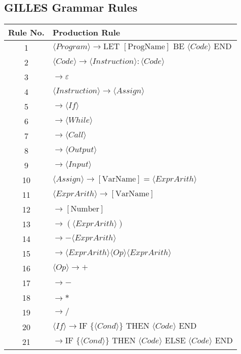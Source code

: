 \subsection{GILLES Grammar Rules}
\begin{table}[h!]
\centering
\footnotesize
\begin{tabular}{|c|l|}
\hline
\textbf{Rule No.} & \textbf{Production Rule} \\ \hline
1  & $\langle Program \rangle \rightarrow \text{LET } [\text{ProgName}] \text{ BE } \langle Code \rangle \text{ END}$ \\ \hline
2  & $\langle Code \rangle \rightarrow \langle Instruction \rangle : \langle Code \rangle$ \\ \hline
3  & $\rightarrow \varepsilon$ \\ \hline
4  & $\langle Instruction \rangle \rightarrow \langle Assign \rangle$ \\ \hline
5  & $\rightarrow \langle If \rangle$ \\ \hline
6  & $\rightarrow \langle While \rangle$ \\ \hline
7  & $\rightarrow \langle Call \rangle$ \\ \hline
8  & $\rightarrow \langle Output \rangle$ \\ \hline
9  & $\rightarrow \langle Input \rangle$ \\ \hline
10 & $\langle Assign \rangle \rightarrow [\text{VarName}] = \langle ExprArith \rangle$ \\ \hline
11 & $\langle ExprArith \rangle \rightarrow [\text{VarName}]$ \\ \hline
12 & $\rightarrow [\text{Number}]$ \\ \hline
13 & $\rightarrow ( \langle ExprArith \rangle )$ \\ \hline
14 & $\rightarrow - \langle ExprArith \rangle$ \\ \hline
15 & $\rightarrow \langle ExprArith \rangle \langle Op \rangle \langle ExprArith \rangle$ \\ \hline
16 & $\langle Op \rangle \rightarrow +$ \\ \hline
17 & $\rightarrow -$ \\ \hline
18 & $\rightarrow *$ \\ \hline
19 & $\rightarrow /$ \\ \hline
20 & $\langle If \rangle \rightarrow \text{IF } \{ \langle Cond \rangle \} \text{ THEN } \langle Code \rangle \text{ END}$ \\ \hline
21 & $\rightarrow \text{IF } \{ \langle Cond \rangle \} \text{ THEN } \langle Code \rangle \text{ ELSE } \langle Code \rangle \text{ END}$ \\ \hline

\end{tabular}
\end{table}
